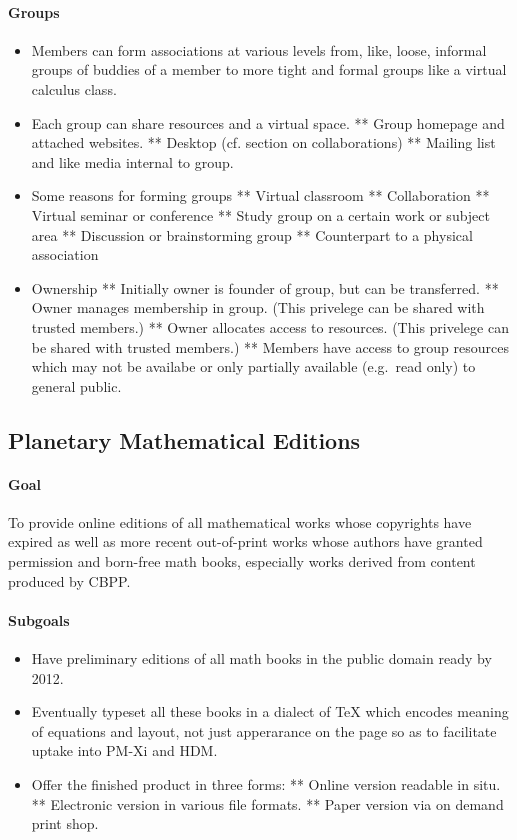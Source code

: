 \paragraph{Groups}

\begin{itemize}
\item
  Members can form associations at various levels from, like, loose,
  informal groups of buddies of a member to more tight and formal groups
  like a virtual calculus class.
\item
  Each group can share resources and a virtual space. ** Group homepage
  and attached websites. ** Desktop (cf. section on collaborations) **
  Mailing list and like media internal to group.
\item
  Some reasons for forming groups ** Virtual classroom ** Collaboration
  ** Virtual seminar or conference ** Study group on a certain work or
  subject area ** Discussion or brainstorming group ** Counterpart to a
  physical association
\item
  Ownership ** Initially owner is founder of group, but can be
  transferred. ** Owner manages membership in group. (This privelege can
  be shared with trusted members.) ** Owner allocates access to
  resources. (This privelege can be shared with trusted members.) **
  Members have access to group resources which may not be availabe or
  only partially available (e.g.~read only) to general public.
\end{itemize}
\subsection{Planetary Mathematical Editions}

\paragraph{Goal} To provide online editions of all mathematical works whose
copyrights have expired as well as more recent out-of-print works whose
authors have granted permission and born-free math books, especially
works derived from content produced by CBPP.

\paragraph{Subgoals}

\begin{itemize}
\item
  Have preliminary editions of all math books in the public domain ready
  by 2012.
\item
  Eventually typeset all these books in a dialect of TeX which encodes
  meaning of equations and layout, not just apperarance on the page so
  as to facilitate uptake into PM-Xi and HDM.
\item
  Offer the finished product in three forms: ** Online version readable
  in situ. ** Electronic version in various file formats. ** Paper
  version via on demand print shop.
\end{itemize}

